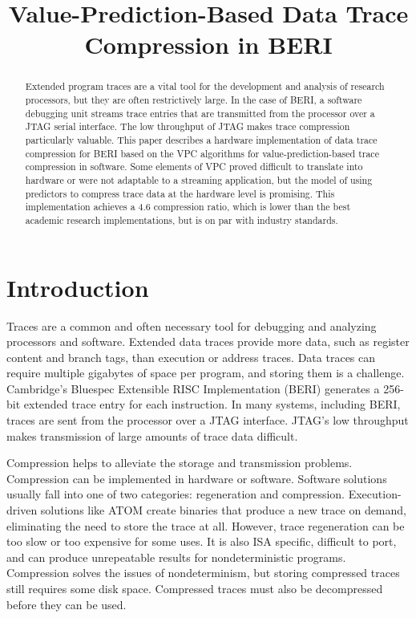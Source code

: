 \documentclass[conference]{IEEEtran}
\begin{document}
%
\title{Value-Prediction-Based Data Trace \\ Compression in BERI} 


\author{
}

\maketitle

\begin{abstract}
Extended program traces are a vital tool for the development and analysis of research processors, but they are often
restrictively large. In the case of BERI, a software debugging unit streams trace entries that are transmitted from the processor over
a JTAG serial interface. The low throughput of JTAG makes trace compression particularly valuable. 
This paper describes a hardware implementation of data trace compression for BERI based on the VPC algorithms for 
value-prediction-based trace compression in software. Some elements of VPC proved difficult to translate into hardware or were not adaptable to a streaming application, but the model of using predictors to compress trace data at the hardware level is promising. 
This implementation achieves a 4.6 compression ratio, which is lower than the best academic research implementations, but is
on par with industry standards.

\end{abstract}

\section{Introduction}
Traces are a common and often necessary tool for debugging and analyzing processors and software. Extended data traces provide more data, such as register content and branch tags, than execution or address traces. Data traces can require multiple gigabytes of space per program, and storing them is a challenge. Cambridge's Bluespec Extensible RISC Implementation (BERI) \cite{beri} generates a 256-bit extended trace entry for each instruction. In many systems, including BERI, traces are sent from the processor over a JTAG interface. JTAG's low throughput makes transmission of large amounts of trace data difficult. 

Compression helps to alleviate the storage and transmission problems. Compression can be implemented in hardware or software. Software solutions usually fall into one of two categories: regeneration and compression. Execution-driven solutions like ATOM \cite{ATOM} create binaries that produce a new trace on demand, eliminating the need to store the trace at all. However, trace regeneration can be too slow or too expensive for some uses. It is also ISA specific, difficult to port, and can produce unrepeatable results for nondeterministic programs. Compression solves the issues of nondeterminism, but storing compressed traces still requires some disk space. Compressed traces must also be decompressed before they can be used.
\end{document}
